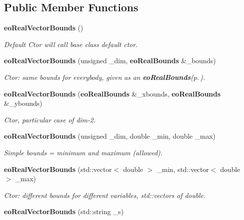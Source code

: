 \subsection*{Public Member Functions}
\begin{CompactItemize}
\item 
{\bf eo\-Real\-Vector\-Bounds} ()\label{classeo_real_vector_bounds_a0}

\begin{CompactList}\small\item\em Default Ctor will call base class default ctor. \item\end{CompactList}\item 
{\bf eo\-Real\-Vector\-Bounds} (unsigned \_\-dim, {\bf eo\-Real\-Bounds} \&\_\-bounds)\label{classeo_real_vector_bounds_a1}

\begin{CompactList}\small\item\em Ctor: same bounds for everybody, given as an {\bf eo\-Real\-Bounds}{\rm (p.\,\pageref{classeo_real_bounds})}. \item\end{CompactList}\item 
{\bf eo\-Real\-Vector\-Bounds} ({\bf eo\-Real\-Bounds} \&\_\-xbounds, {\bf eo\-Real\-Bounds} \&\_\-ybounds)\label{classeo_real_vector_bounds_a2}

\begin{CompactList}\small\item\em Ctor, particular case of dim-2. \item\end{CompactList}\item 
{\bf eo\-Real\-Vector\-Bounds} (unsigned \_\-dim, double \_\-min, double \_\-max)\label{classeo_real_vector_bounds_a3}

\begin{CompactList}\small\item\em Simple bounds = minimum and maximum (allowed). \item\end{CompactList}\item 
{\bf eo\-Real\-Vector\-Bounds} (std::vector$<$ double $>$ \_\-min, std::vector$<$ double $>$ \_\-max)\label{classeo_real_vector_bounds_a4}

\begin{CompactList}\small\item\em Ctor: different bounds for different variables, std::vectors of double. \item\end{CompactList}\item 
{\bf eo\-Real\-Vector\-Bounds} (std::string \_\-s)\label{classeo_real_vector_bounds_a5}


\end{CompactItemize}
